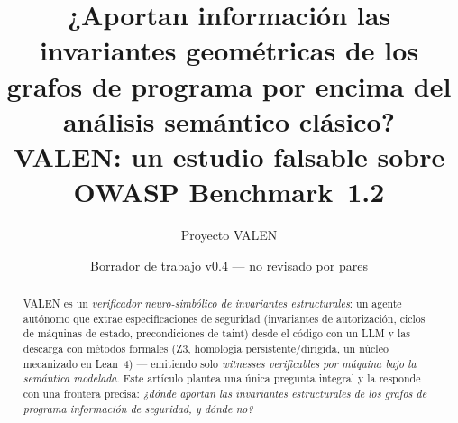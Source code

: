 \documentclass[11pt]{article}
\title{\bfseries ¿Aportan información las invariantes geométricas de los\\ grafos de programa por encima del análisis semántico clásico?\\[2mm]\Large VALEN: un estudio falsable sobre OWASP Benchmark~1.2}
\author{Proyecto VALEN}
\date{Borrador de trabajo v0.4 --- no revisado por pares}
\begin{document}
\maketitle

\begin{abstract}
\noindent VALEN es un \emph{verificador neuro-simbólico de invariantes
estructurales}: un agente autónomo que extrae especificaciones de seguridad
(invariantes de autorización, ciclos de máquinas de estado, precondiciones de
taint) desde el código con un LLM y las descarga con métodos formales (Z3,
homología persistente/dirigida, un núcleo mecanizado en Lean~4) --- emitiendo
solo \emph{witnesses verificables por máquina bajo la semántica modelada}. Este
artículo plantea una única pregunta integral y la responde con una frontera
precisa: \emph{¿dónde aportan las invariantes estructurales de los grafos de
programa información de seguridad, y dónde no?}


\end{abstract}
\end{document}
